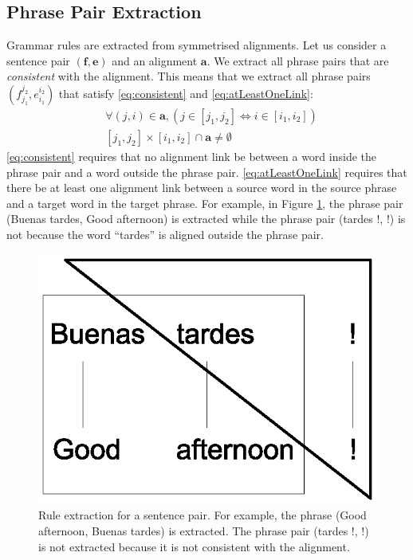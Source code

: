 

\subsection{Phrase Pair Extraction}
\label{sec:phrasextract}

Grammar rules are extracted from symmetrised alignments.
Let us consider a sentence pair $(\bm{f},\bm{e})$ and an alignment $\bm{a}$.
We extract all phrase pairs that are {\em consistent} with the alignment.
This means that we extract all phrase pairs $(f_{j_1}^{j_2},e_{i_1}^{i_2})$ that
satisfy \autoref{eq:consistent} and \autoref{eq:atLeastOneLink}:
%
\begin{align}
  & \forall (j,i) \in \bm{a}, (j \in [j_1, j_2] \Leftrightarrow i \in [i_1,i_2]) \label{eq:consistent} \\
  & [j_1, j_2] \times [i_1, i_2] \cap \bm{a} \neq \emptyset \label{eq:atLeastOneLink}
\end{align}
%
\autoref{eq:consistent} requires that no alignment link be between a word
inside the phrase pair and a word outside the phrase pair.
\autoref{eq:atLeastOneLink} requires that there be at least one alignment link
between a source word in the source phrase and a target word in the target phrase.
For example, in Figure \ref{fig:ruleextract}, the phrase pair
(Buenas tardes, Good afternoon) is extracted while the
phrase pair (tardes !, !) is not because the word ``tardes'' is aligned
outside the phrase pair.
%
      \begin{figure}[h]
        \begin{center}
          \vspace*{-5cm}
          \includegraphics[scale=0.5]{figures/phraseextraction.eps}
          \vspace*{-5cm}
        \end{center}
        \caption{Rule extraction for a sentence pair. For example, the phrase (Good afternoon, Buenas tardes) is extracted. The phrase pair (tardes !, !) is not extracted because it is
        not consistent with the alignment.}
        \label{fig:ruleextract}
      \end{figure}

